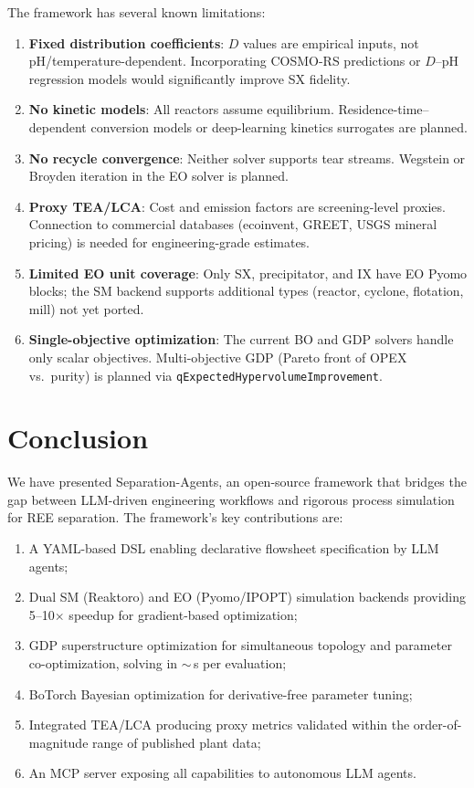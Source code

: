 \documentclass[11pt]{article}
\begin{document}
The framework has several known limitations:
\begin{enumerate}
  \item \textbf{Fixed distribution coefficients}: $D$ values are
    empirical inputs, not pH/temperature-dependent.  Incorporating
    COSMO-RS predictions or $D$--pH regression models would
    significantly improve SX fidelity.
  \item \textbf{No kinetic models}: All reactors assume equilibrium.
    Residence-time--dependent conversion models or deep-learning
    kinetics surrogates are planned.
  \item \textbf{No recycle convergence}: Neither solver supports tear
    streams.  Wegstein or Broyden iteration in the EO solver is
    planned.
  \item \textbf{Proxy TEA/LCA}: Cost and emission factors are
    screening-level proxies.  Connection to commercial databases
    (ecoinvent, GREET, USGS mineral pricing) is needed for
    engineering-grade estimates.
  \item \textbf{Limited EO unit coverage}: Only SX, precipitator,
    and IX have EO Pyomo blocks; the SM backend supports additional
    types (reactor, cyclone, flotation, mill) not yet ported.
  \item \textbf{Single-objective optimization}: The current BO and
    GDP solvers handle only scalar objectives.  Multi-objective GDP
    (Pareto front of OPEX vs.\ purity) is planned via
    \texttt{qExpectedHypervolumeImprovement}.
\end{enumerate}


\section{Conclusion}\label{sec:conclusion}

We have presented Separation-Agents, an open-source framework that
bridges the gap between LLM-driven engineering workflows and rigorous
process simulation for REE separation.  The framework's key
contributions are:
\begin{enumerate}
  \item A YAML-based DSL enabling declarative flowsheet specification
    by LLM agents;
  \item Dual SM (Reaktoro) and EO (Pyomo/IPOPT) simulation backends
    providing 5--10$\times$ speedup for gradient-based optimization;
  \item GDP superstructure optimization for simultaneous topology
    and parameter co-optimization, solving in $\sim$\,s per
    evaluation;
  \item BoTorch Bayesian optimization for derivative-free parameter
    tuning;
  \item Integrated TEA/LCA producing proxy metrics validated within
    the order-of-magnitude range of published plant data;
  \item An MCP server exposing all capabilities to autonomous LLM
    agents.
\end{enumerate}
\end{document}
